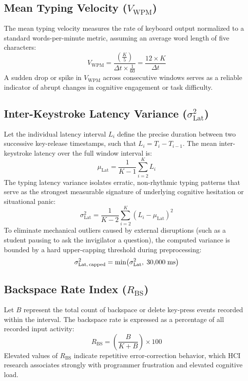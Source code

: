 \subsection{Mean Typing Velocity ($V_{\text{WPM}}$)}
The mean typing velocity measures the rate of keyboard output normalized to a standard words-per-minute metric, assuming an average word length of five characters:
\begin{equation}
V_{\text{WPM}} = \frac{\left(\frac{K}{5}\right)}{\Delta t \times \frac{1}{60}} = \frac{12 \times K}{\Delta t}
\end{equation}
A sudden drop or spike in $V_{\text{WPM}}$ across consecutive windows serves as a reliable indicator of abrupt changes in cognitive engagement or task difficulty.

\subsection{Inter-Keystroke Latency Variance ($\sigma^2_{\text{Lat}}$)}
Let the individual latency interval $L_i$ define the precise duration between two successive key-release timestamps, such that $L_i = T_i - T_{i-1}$. The mean inter-keystroke latency over the full window interval is:
\begin{equation}
\mu_{\text{Lat}} = \frac{1}{K-1} \sum_{i=2}^{K} L_i
\end{equation}
The typing latency variance isolates erratic, non-rhythmic typing patterns that serve as the strongest measurable signature of underlying cognitive hesitation or situational panic:
\begin{equation}
\sigma^2_{\text{Lat}} = \frac{1}{K-2} \sum_{i=2}^{K} \left(L_i - \mu_{\text{Lat}}\right)^2
\end{equation}
To eliminate mechanical outliers caused by external disruptions (such as a student pausing to ask the invigilator a question), the computed variance is bounded by a hard upper-capping threshold during preprocessing:
\begin{equation}
\sigma^2_{\text{Lat,\,capped}} = \min\!\left(\sigma^2_{\text{Lat}},\; 30{,}000\;\text{ms}\right)
\end{equation}

\subsection{Backspace Rate Index ($R_{\text{BS}}$)}
Let $B$ represent the total count of backspace or delete key-press events recorded within the interval. The backspace rate is expressed as a percentage of all recorded input activity:
\begin{equation}
R_{\text{BS}} = \left(\frac{B}{K + B}\right) \times 100
\end{equation}
Elevated values of $R_{\text{BS}}$ indicate repetitive error-correction behavior, which HCI research associates strongly with programmer frustration and elevated cognitive load.

